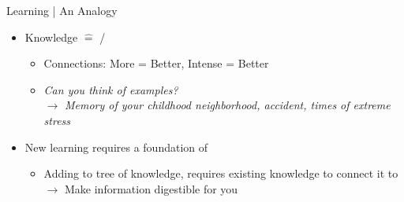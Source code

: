 \documentclass{ercisbeamer}
\begin{document}
\begin{frame}{Learning | An Analogy}
    \begin{tbox}
        \begin{itemize}
            \item Knowledge $\widehat =$   /  
            \begin{itemize}
                \item Connections: More = Better, Intense = Better
                \item \emph{Can you think of examples?} \pause \\ $\rightarrow$ \emph{Memory of your childhood neighborhood, accident, times of extreme stress}
            \end{itemize}
            \item New learning requires a foundation of 
            \begin{itemize}
                \item Adding to tree of knowledge, requires existing knowledge to connect it to \\ $\rightarrow$ Make information digestible for you
            \end{itemize}
        \end{itemize}
    \end{tbox}
\end{frame}
\setbgimage{}
\end{document}
